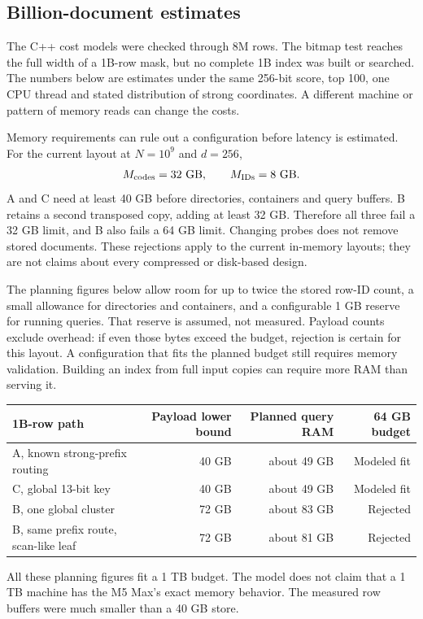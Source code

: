 \subsection{Billion-document estimates}
\label{sec:billion}
The C++ cost models were checked through 8M rows. The bitmap test reaches the full width
of a 1B-row mask, but no complete 1B index was built or searched. The numbers below are
estimates under the same 256-bit score, top 100, one CPU thread and stated distribution of
strong coordinates. A different machine or pattern of memory reads can change the costs.

Memory requirements can rule out a configuration before latency is estimated.
For the current layout at $N=10^9$ and $d=256$,
\[
M_{\rm codes}=32\ \mathrm{GB},\qquad M_{\rm IDs}=8\ \mathrm{GB}.
\]
A and C need at least 40 GB before directories, containers and query buffers. B retains a
second transposed copy, adding at least 32 GB. Therefore all three fail a 32 GB limit, and B
also fails a 64 GB limit. Changing probes does not remove stored documents. These rejections
apply to the current in-memory layouts; they are not claims about every compressed or disk-based design.

The planning figures below allow room for up to twice the stored row-ID count, a small
allowance for directories and containers, and a configurable 1 GB reserve for running queries.
That reserve is assumed, not measured. Payload counts exclude overhead: if even those bytes
exceed the budget, rejection is certain for this layout. A configuration that fits the planned budget still requires memory validation. Building an index from full input copies can require more RAM than serving it.

\begin{center}\small
\begin{tabular}{@{}lrrr@{}}\toprule
1B-row path & Payload lower bound & Planned query RAM & 64 GB budget\\\midrule
A, known strong-prefix routing & 40 GB & about 49 GB & Modeled fit\\
C, global 13-bit key & 40 GB & about 49 GB & Modeled fit\\
B, one global cluster & 72 GB & about 83 GB & Rejected\\
B, same prefix route, scan-like leaf & 72 GB & about 81 GB & Rejected\\\bottomrule
\end{tabular}\normalsize\end{center}
All these planning figures fit a 1 TB budget. The model does not claim that a 1 TB machine has
the M5 Max's exact memory behavior. The measured row buffers were much smaller than a 40 GB store.

